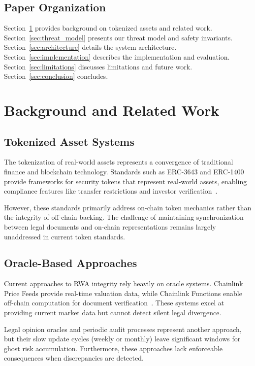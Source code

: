 \documentclass[10pt,conference]{IEEEtran}
\begin{document}
\subsection{Paper Organization}
\label{subsec:organization}

Section~\ref{sec:background} provides background on tokenized assets and related work. Section~\ref{sec:threat_model} presents our threat model and safety invariants. Section~\ref{sec:architecture} details the system architecture. Section~\ref{sec:implementation} describes the implementation and evaluation. Section~\ref{sec:limitations} discusses limitations and future work. Section~\ref{sec:conclusion} concludes.

\section{Background and Related Work}
\label{sec:background}

\subsection{Tokenized Asset Systems}
\label{subsec:tokenized_assets}

The tokenization of real-world assets represents a convergence of traditional finance and blockchain technology. Standards such as ERC-3643 and ERC-1400 provide frameworks for security tokens that represent real-world assets, enabling compliance features like transfer restrictions and investor verification~\cite{erc3643}.

However, these standards primarily address on-chain token mechanics rather than the integrity of off-chain backing. The challenge of maintaining synchronization between legal documents and on-chain representations remains largely unaddressed in current token standards.

\subsection{Oracle-Based Approaches}
\label{subsec:oracle_approaches}

Current approaches to RWA integrity rely heavily on oracle systems. Chainlink Price Feeds provide real-time valuation data, while Chainlink Functions enable off-chain computation for document verification~\cite{chainlink2023}. These systems excel at providing current market data but cannot detect silent legal divergence.

Legal opinion oracles and periodic audit processes represent another approach, but their slow update cycles (weekly or monthly) leave significant windows for ghost risk accumulation. Furthermore, these approaches lack enforceable consequences when discrepancies are detected.
\end{document}
